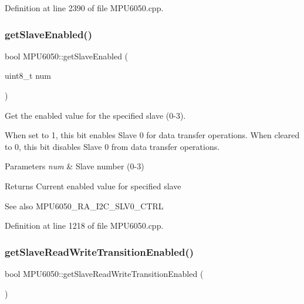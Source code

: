 Definition at line 2390 of file M\+P\+U6050.\+cpp.

\mbox{\label{classMPU6050_a5f14bde83fe00b27dec6776fc44e89c2}} 
\subsubsection{\texorpdfstring{getSlaveEnabled()}{getSlaveEnabled()}}
{\footnotesize\ttfamily bool M\+P\+U6050\+::get\+Slave\+Enabled (\begin{DoxyParamCaption}\item[{uint8\+\_\+t}]{num }\end{DoxyParamCaption})}



Get the enabled value for the specified slave (0-\/3). 

When set to 1, this bit enables Slave 0 for data transfer operations. When cleared to 0, this bit disables Slave 0 from data transfer operations. 
\begin{DoxyParams}{Parameters}
{\em num} & Slave number (0-\/3) \\
\hline
\end{DoxyParams}
\begin{DoxyReturn}{Returns}
Current enabled value for specified slave 
\end{DoxyReturn}
\begin{DoxySeeAlso}{See also}
M\+P\+U6050\+\_\+\+R\+A\+\_\+\+I2\+C\+\_\+\+S\+L\+V0\+\_\+\+C\+T\+RL 
\end{DoxySeeAlso}


Definition at line 1218 of file M\+P\+U6050.\+cpp.

\mbox{\label{classMPU6050_a6b3c3aab80fcaa384303f9df2a59d7eb}} 
\subsubsection{\texorpdfstring{getSlaveReadWriteTransitionEnabled()}{getSlaveReadWriteTransitionEnabled()}}
{\footnotesize\ttfamily bool M\+P\+U6050\+::get\+Slave\+Read\+Write\+Transition\+Enabled (\begin{DoxyParamCaption}{ }\end{DoxyParamCaption})}




